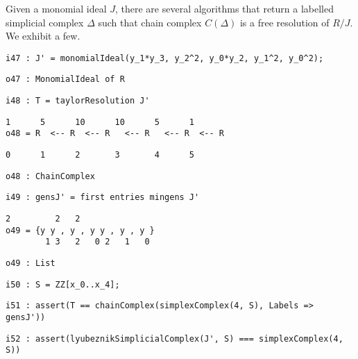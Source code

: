 \documentclass[12pt,leqno]{amsart}
\theoremstyle{definition}
\begin{document}
Given a monomial ideal $J$, there are several algorithms that return a
labelled simplicial complex $\Delta$ such that chain complex $C(\Delta)$ is a
free resolution of $R/J$.  We exhibit a few.
\begin{lstlisting}[xleftmargin=10pt, aboveskip=3.0pt, belowskip=1.5pt]
i47 : J' = monomialIdeal(y_1*y_3, y_2^2, y_0*y_2, y_1^2, y_0^2);
\end{lstlisting}
\begin{lstlisting}[xleftmargin=10pt, aboveskip=1.5pt, belowskip=1.5pt]
o47 : MonomialIdeal of R
\end{lstlisting}
\begin{lstlisting}[xleftmargin=10pt, aboveskip=1.5pt, belowskip=1.5pt]
i48 : T = taylorResolution J'
\end{lstlisting}
\begin{lstlisting}[xleftmargin=10pt, lineskip=-10pt, aboveskip=1.5pt, belowskip=1.5pt]
       1      5      10      10      5      1
o48 = R  <-- R  <-- R   <-- R   <-- R  <-- R
\end{lstlisting}
\begin{lstlisting}[xleftmargin=10pt, aboveskip=1.5pt, belowskip=1.5pt] 
      0      1      2       3       4      5
\end{lstlisting}
\begin{lstlisting}[xleftmargin=10pt, aboveskip=1.5pt, belowskip=1.5pt]
o48 : ChainComplex
\end{lstlisting}
\begin{lstlisting}[xleftmargin=10pt, aboveskip=1.5pt, belowskip=1.5pt]
i49 : gensJ' = first entries mingens J'
\end{lstlisting}
\begin{lstlisting}[xleftmargin=10pt, lineskip=-10pt, aboveskip=1.5pt, belowskip=1.5pt]
              2         2   2
o49 = {y y , y , y y , y , y }
        1 3   2   0 2   1   0
\end{lstlisting}
\begin{lstlisting}[xleftmargin=10pt, aboveskip=1.5pt, belowskip=1.5pt]
o49 : List
\end{lstlisting}
\begin{lstlisting}[xleftmargin=10pt, aboveskip=1.5pt, belowskip=1.5pt]
i50 : S = ZZ[x_0..x_4];
\end{lstlisting}
\begin{lstlisting}[xleftmargin=10pt, aboveskip=1.5pt, belowskip=1.5pt]
i51 : assert(T == chainComplex(simplexComplex(4, S), Labels => gensJ'))
\end{lstlisting}
\begin{lstlisting}[xleftmargin=10pt, aboveskip=1.5pt, belowskip=1.5pt]
i52 : assert(lyubeznikSimplicialComplex(J', S) === simplexComplex(4, S))
\end{lstlisting}
\end{document}
